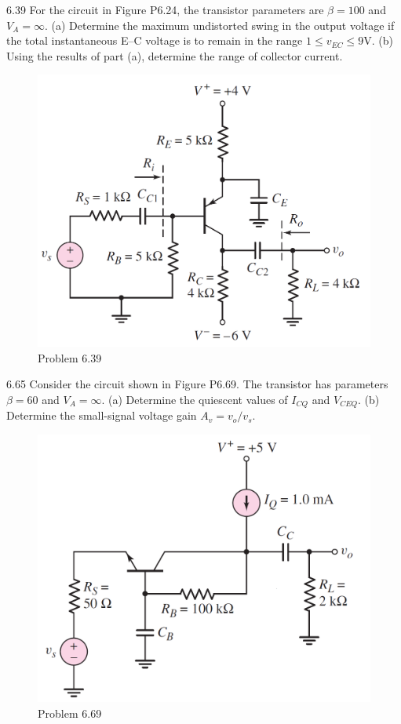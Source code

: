 \documentclass[a4paper,11pt,UTF8]{article}
\begin{document}
6.39 For the circuit in Figure P6.24, the transistor parameters are $\beta = 100$ and
$V_A =\infty$. (a) Determine the maximum undistorted swing in the output
voltage if the total instantaneous E–C voltage is to remain in the range
$1 \leq v_{EC} \leq 9 $V. (b) Using the results of part (a), determine the range of collector
current.
\begin{figure}[H] 
	\centering 
	\includegraphics[scale=0.3]{MD6.39.png}
	\caption{Problem 6.39}
\end{figure}
6.65 Consider the circuit shown in Figure P6.69. The transistor has parameters
$\beta = 60$ and $V_A =\infty$. (a) Determine the quiescent values of $I_{CQ}$ and $V_{CEQ}$.
(b) Determine the small-signal voltage gain $A_v = v_o/v_s$.
\begin{figure}[H] 
	\centering 
	\includegraphics[scale=0.3]{MD6.69.png}
	\caption{Problem 6.69}
\end{figure}
\end{document}
